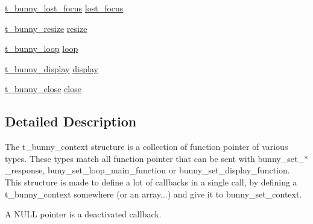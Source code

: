 \begin{DoxyCompactItemize}
\item 
\hyperlink{events_8h_aa040457e55d20ff54f5cab67d7ecea6b}{t\-\_\-bunny\-\_\-lost\-\_\-focus} \hyperlink{structs__bunny__context_a05bb6e290cf8bac68dd5142e39406a31}{lost\-\_\-focus}
\item 
\hyperlink{events_8h_afd5ceaa3b3efadb30569c28164d39187}{t\-\_\-bunny\-\_\-resize} \hyperlink{structs__bunny__context_a90ca6419f3b754ca9bdce2340f388ad1}{resize}
\item 
\hyperlink{events_8h_ae4bd2301727bd9badea4701c67ee7a26}{t\-\_\-bunny\-\_\-loop} \hyperlink{structs__bunny__context_a50035481a3133992151c740746721bbf}{loop}
\item 
\hyperlink{events_8h_a35c3d20f91259d6ffa5ff31bc3c37aaf}{t\-\_\-bunny\-\_\-display} \hyperlink{structs__bunny__context_a4b91f4106732164b9e9fba2a8235489f}{display}
\item 
\hyperlink{events_8h_a99955d212b8a4b9e07177e28628434f6}{t\-\_\-bunny\-\_\-close} \hyperlink{structs__bunny__context_af9e8da8ba747848573ad01f39adb3b73}{close}
\end{DoxyCompactItemize}


\subsection{Detailed Description}
The t\-\_\-bunny\-\_\-context structure is a collection of function pointer of various types. These types match all function pointer that can be sent with bunny\-\_\-set\-\_\-$\ast$\-\_\-response, buny\-\_\-set\-\_\-loop\-\_\-main\-\_\-function or bunny\-\_\-set\-\_\-display\-\_\-function. This structure is made to define a lot of callbacks in a single call, by defining a t\-\_\-bunny\-\_\-context somewhere (or an array...) and give it to bunny\-\_\-set\-\_\-context.

A N\-U\-L\-L pointer is a deactivated callback. 

